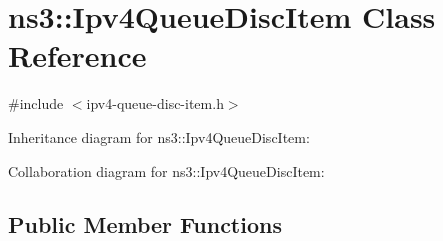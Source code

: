 \hypertarget{classns3_1_1Ipv4QueueDiscItem}{}\section{ns3\+:\+:Ipv4\+Queue\+Disc\+Item Class Reference}
\label{classns3_1_1Ipv4QueueDiscItem}


{\ttfamily \#include $<$ipv4-\/queue-\/disc-\/item.\+h$>$}



Inheritance diagram for ns3\+:\+:Ipv4\+Queue\+Disc\+Item\+:


Collaboration diagram for ns3\+:\+:Ipv4\+Queue\+Disc\+Item\+:
\subsection*{Public Member Functions}
